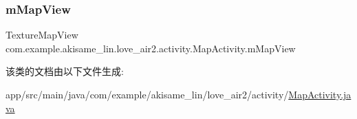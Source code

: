 \subsubsection{\texorpdfstring{mMapView}{mMapView}}
{\footnotesize\ttfamily Texture\+Map\+View com.\+example.\+akisame\+\_\+lin.\+love\+\_\+air2.\+activity.\+Map\+Activity.\+m\+Map\+View\hspace{0.3cm}{\ttfamily [private]}}



该类的文档由以下文件生成\+:\begin{DoxyCompactItemize}
\item 
app/src/main/java/com/example/akisame\+\_\+lin/love\+\_\+air2/activity/\mbox{\hyperlink{_map_activity_8java}{Map\+Activity.\+java}}\end{DoxyCompactItemize}
